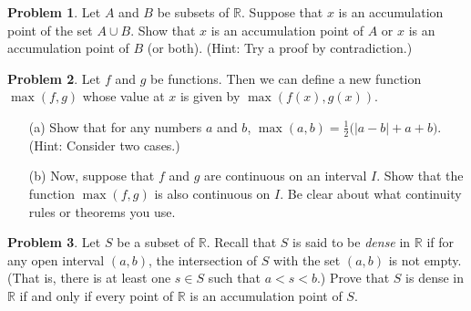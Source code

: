 \documentclass[12pt]{article}
\newcommand{\R}{{\mathbb R}}
\theoremstyle{definition}
\newtheorem{problem}{Problem}
\newenvironment{answer}{\par\medskip\bgroup\color{darkblue}}{\egroup\par\medskip}
\begin{document}
\begin{answer}
\end{answer}





\begin{problem}  %
Let $A$ and $B$ be subsets of $\R$.  Suppose that $x$ is an accumulation point of the set
$A\cup B$.  Show that $x$ is an accumulation point of $A$ or $x$ is an accumulation
point of $B$ (or both).   (Hint: Try a proof by contradiction.)
\end{problem}

\begin{answer}
\end{answer}





\begin{problem}  %
Let $f$ and $g$ be functions. Then we can define a new function $\max(f,g)$ whose value
at $x$ is given by $\max(f(x),g(x))$.
\begin{itemize}
\item[(a)] Show that for any numbers $a$ and $b$, $\max(a,b)=\frac{1}{2}\big(|a-b|+a+b\big)$.
(Hint: Consider two cases.)
\item[(b)] Now, suppose that $f$ and $g$ are continuous on an interval $I$.  Show that
the function $\max(f,g)$ is also continuous on $I$.  Be clear about what continuity rules
or theorems you use.
\end{itemize}
\end{problem}

\begin{answer}
\end{answer}





\begin{problem}  %
Let $S$ be a subset of $\R$.  Recall that $S$ is said to be {\it dense\/} in $\R$ if
for any open interval $(a,b)$, the intersection of $S$ with the set
$(a,b)$ is not empty.  (That is, there is at least one $s\in S$ such that $a < s < b$.)
Prove that $S$ is dense in $\R$ if and only if every point of $\R$ is an 
accumulation point of $S$.
\end{problem}

\begin{answer}
\end{answer}
\end{document}
